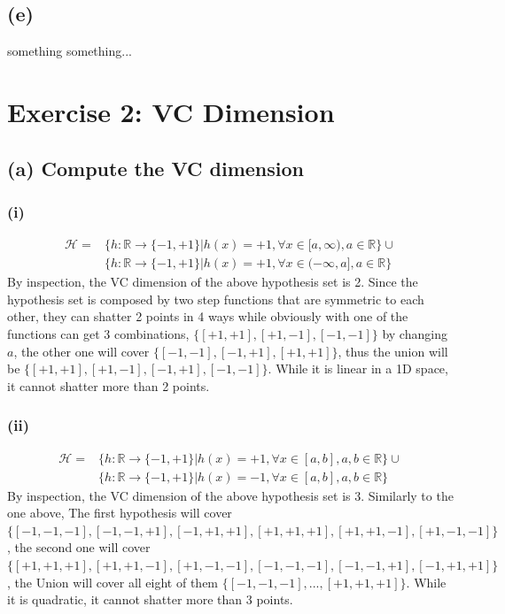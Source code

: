 \documentclass[11pt]{article}
\begin{document}
\subsection*{(e)}
something something...
\pagebreak
\section*{Exercise 2: VC Dimension}
\subsection*{(a) Compute the VC dimension}
\subsubsection*{(i)}	
\begin{equation}
\begin{split}
\mathcal{H}=&\{h:\mathbb{R}\rightarrow\{-1,+1\}|h(x)=+1,\forall x\in[a,\infty), a\in\mathbb{R}\} \cup \\
&\{h:\mathbb{R}\rightarrow\{-1,+1\}|h(x)=+1,\forall x\in(-\infty,a], a\in\mathbb{R}\}
\end{split}
\end{equation}
By inspection, the VC dimension of the above hypothesis set is 2. Since the hypothesis set is composed by two step functions that are symmetric to each other, they can shatter 2 points in 4 ways while obviously with one of the functions can get 3 combinations, $\{[+1,+1],[+1,-1],[-1,-1]\}$ by changing $a$, the other one will cover $\{[-1,-1],[-1,+1],[+1,+1]\}$, thus the union will be $\{[+1,+1],[+1,-1],[-1,+1],[-1,-1]\}$. While it is linear in a 1D space, it cannot shatter more than 2 points.

\subsubsection*{(ii)}
\begin{equation}
\begin{split}
\mathcal{H}=&\{h:\mathbb{R}\rightarrow\{-1,+1\}|h(x)=+1,\forall x\in[a,b], a,b\in\mathbb{R}\} \cup \\
&\{h:\mathbb{R}\rightarrow\{-1,+1\}|h(x)=-1,\forall x\in[a,b], a,b\in\mathbb{R}\}
\end{split}
\end{equation}
By inspection, the VC dimension of the above hypothesis set is 3. Similarly to the one above, The first hypothesis will cover $\{[-1,-1,-1],[-1,-1,+1],[-1,+1,+1],[+1,+1,+1],[+1,+1,-1],[+1,-1,-1]\}$, the second one will cover $\{[+1,+1,+1],[+1,+1,-1],[+1,-1,-1],[-1,-1,-1],[-1,-1,+1],[-1,+1,+1]\}$, the Union will cover all eight of them $\{[-1,-1,-1], ... ,[+1,+1,+1]\}$. While it is quadratic, it cannot shatter more than 3 points. 
\end{document}
